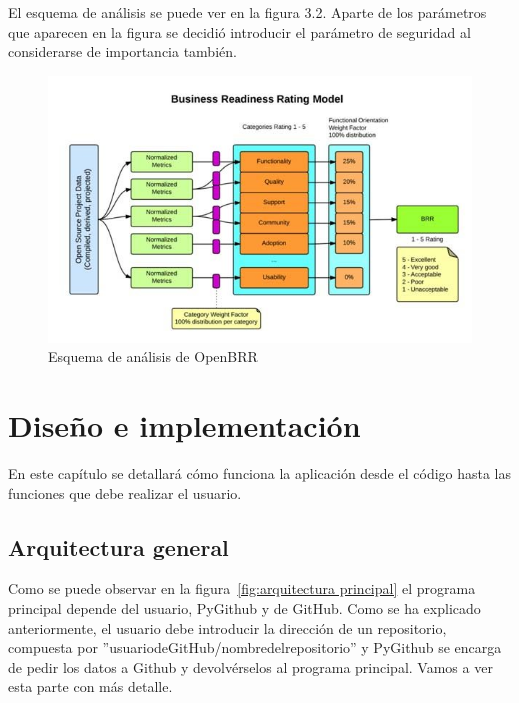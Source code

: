 \documentclass[a4paper, 12pt]{book}
\begin{document}
El esquema de análisis se puede ver en la figura 3.2. Aparte de los parámetros que aparecen en la figura se decidió introducir el parámetro de seguridad al considerarse de importancia también.

\begin{figure}
  \centering
  \includegraphics[width=14cm, keepaspectratio]{img/openbrr.png}
  \caption{Esquema de análisis de OpenBRR}\label{fig:OpenBRR}
\end{figure}



\cleardoublepage
\chapter{Diseño e implementación}

En este capítulo se detallará cómo funciona la aplicación desde el código hasta las funciones que debe realizar el usuario.

\section{Arquitectura general} 
\label{sec:arquitectura}

Como se puede observar en la figura~\ref{fig:arquitectura principal} el programa principal depende del usuario, PyGithub y de GitHub. Como se ha explicado anteriormente, el usuario debe introducir la dirección de un repositorio, compuesta por ''usuario\textunderscore de\textunderscore GitHub/nombre\textunderscore del\textunderscore repositorio'' y PyGithub se encarga de pedir los datos a Github y devolvérselos al programa principal. Vamos a ver esta parte con más detalle.
\end{document}
